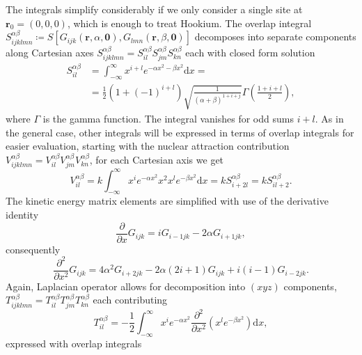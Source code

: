 \documentclass[final,3p,times,twocolumn]{elsarticle}
\begin{document}
	The integrals simplify considerably if we only consider a single site at $\mathbf{r}_0 = (0, 0, 0)$, which is enough to treat Hookium. The overlap integral $S^{\alpha \beta}_{ijk lmn}\coloneq S[G_{ijk}(\mathbf{r}, \alpha, \mathbf{0}), G_{lmn}(\mathbf{r}, \beta, \mathbf{0})]$ decomposes into separate components along Cartesian axes $S^{\alpha \beta}_{ijk lmn}=S_{il}^{\alpha \beta}S^{\alpha \beta}_{jm}S^{\alpha \beta}_{kn}$ each with closed form solution
	\begin{equation}
		\begin{aligned}
			S_{il}^{\alpha \beta} &= \int_{-\infty}^\infty x^{i+l} e^{-\alpha x^{2}-\beta x^{2}} \mathrm{d}x = \\ & = \frac{1}{2}\left(1 + (-1)^{i+l} \right)\sqrt{\frac{1}{(\alpha + \beta)^{1+i+j}}} \Gamma \left(\frac{1+i+l}{2}\right),
		\end{aligned}
	\end{equation}
	where $\Gamma$ is the gamma function. The integral vanishes for odd sums $i+l$. As in the general case, other integrals will be expressed in terms of overlap integrals for easier evaluation, starting with the nuclear attraction contribution $V^{\alpha \beta}_{ijk lmn}=V_{il}^{\alpha \beta}V^{\alpha \beta}_{jm}V^{\alpha \beta}_{kn}$, for each Cartesian axis we get
	\begin{equation}
		V_{il}^{\alpha \beta} = k \int_{-\infty}^{\infty} x^{i}e^{-\alpha x^{2}} x^2 x^{l}e^{-\beta x^{2}}\mathrm{d}x = k S_{i+2l}^{\alpha \beta} = k S_{il+2}^{\alpha \beta}. 
	\end{equation}
	The kinetic energy matrix elements are simplified with use of the derivative identity
	\begin{equation}
		\frac{\partial}{\partial x} G_{ijk} = iG_{i-1jk} - 2\alpha G_{i+1jk},
	\end{equation}
	consequently 
	\begin{equation}
		\frac{\partial^{2}}{\partial x^{2}} G_{ijk}=4\alpha^{2}G_{i+2jk}-2\alpha(2i+1)G_{ijk}+i(i-1)G_{i-2jk}.
	\end{equation}
	Again, Laplacian operator allows for decomposition into $(xyz)$ components, $T^{\alpha \beta}_{ijk lmn}=T_{il}^{\alpha \beta}T^{\alpha \beta}_{jm}T^{\alpha \beta}_{kn}$ each contributing
	\begin{equation}
		T_{il}^{\alpha \beta} = -\frac{1}{2}\int_{-\infty}^{\infty} x^{i}e^{-\alpha x^{2}} \frac{\partial^{2}}{\partial x^{2}}  \left(x^{l}e^{-\beta x^{2}}\right)\mathrm{d}x,
	\end{equation}
	expressed with overlap integrals
\end{document}
